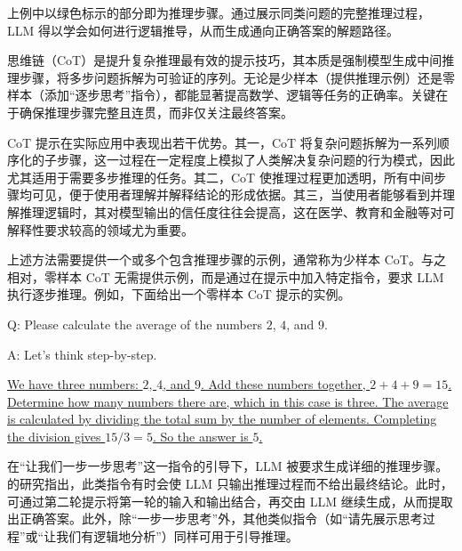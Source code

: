 \noindent 上例中以绿色标示的部分即为推理步骤。通过展示同类问题的完整推理过程，LLM 得以学会如何进行逻辑推导，从而生成通向正确答案的解题路径。

\begin{importantnote}
思维链（CoT）是提升复杂推理最有效的提示技巧，其本质是强制模型生成中间推理步骤，将多步问题拆解为可验证的序列。无论是少样本（提供推理示例）还是零样本（添加“逐步思考”指令），都能显著提高数学、逻辑等任务的正确率。关键在于确保推理步骤完整且连贯，而非仅关注最终答案。
\end{importantnote}

CoT 提示在实际应用中表现出若干优势。其一，CoT 将复杂问题拆解为一系列顺序化的子步骤，这一过程在一定程度上模拟了人类解决复杂问题的行为模式，因此尤其适用于需要多步推理的任务。其二，CoT 使推理过程更加透明，所有中间步骤均可见，便于使用者理解并解释结论的形成依据。其三，当使用者能够看到并理解推理逻辑时，其对模型输出的信任度往往会提高，这在医学、教育和金融等对可解释性要求较高的领域尤为重要。

上述方法需要提供一个或多个包含推理步骤的示例，通常称为少样本 CoT。与之相对，零样本 CoT 无需提供示例，而是通过在提示中加入特定指令，要求 LLM 执行逐步推理。例如，下面给出一个零样本 CoT 提示的实例。

\vspace{0.5em}
\begin{tcolorbox}[frame style={draw=none}]
\begingroup
\setlength{\leftskip}{2em}
\setlength{\rightskip}{2em}

Q: Please calculate the average of the numbers $2$, $4$, and $9$.

\vspace{0.3em}

A: \textcolor[RGB]{154,245,175}{Let's think step-by-step.}

\vspace{0.3em}

\uline{We have three numbers: $2$, $4$, and $9$. Add these numbers together, $2+4+9=15$. Determine how many numbers there are, which in this case is three. The average is calculated by dividing the total sum by the number of elements. Completing the division gives $15/3 = 5$. So the answer is $5$.}

\endgroup
\end{tcolorbox}
\vspace{0.5em}

在“让我们一步一步思考”这一指令的引导下，LLM 被要求生成详细的推理步骤。\citet{kojima-etal:2022large} 的研究指出，此类指令有时会使 LLM 只输出推理过程而不给出最终结论。此时，可通过第二轮提示将第一轮的输入和输出结合，再交由 LLM 继续生成，从而提取出正确答案。此外，除“一步一步思考”外，其他类似指令（如“请先展示思考过程”或“让我们有逻辑地分析”）同样可用于引导推理。

